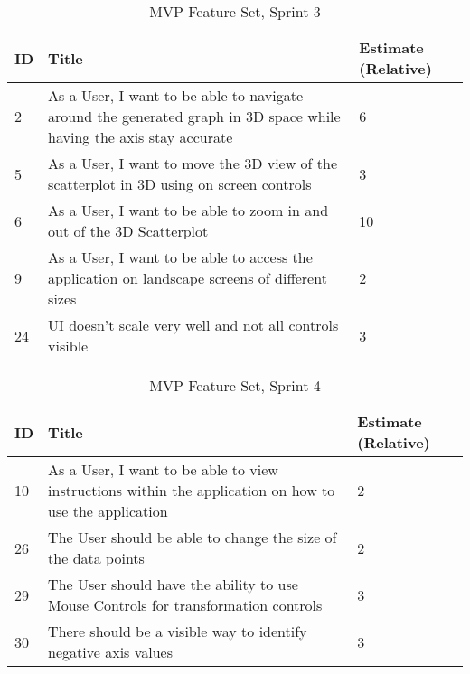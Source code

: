 \begin{table*}[h]
    \begin{tabular}{ | l | l | l | }
        \hline
        ID & Title                                                                                                               & Estimate (Relative) \\
        \hline
        2  & As a User, I want to be able to navigate around the generated graph in 3D space while having the axis stay accurate & 6                   \\
        \hline
        5  & As a User, I want to move the 3D view of the scatterplot in 3D using on screen controls                             & 3                   \\
        \hline
        6  & As a User, I want to be able to zoom in and out of the 3D Scatterplot                                               & 10                  \\
        \hline
        9  & As a User, I want to be able to access the application on landscape screens of different sizes                      & 2                   \\
        \hline
        24 & UI doesn't scale very well and not all controls visible                                                             & 3                   \\
        \hline
    \end{tabular}
    \caption{MVP Feature Set, Sprint 3}
    \label{sprint3}
\end{table*}

\begin{table*}[h]
    \begin{tabular}{ | l | l | l | }
        \hline
        ID & Title                                                                                                  & Estimate (Relative) \\
        \hline
        10 & As a User, I want to be able to view instructions within the application on how to use the application & 2                   \\
        \hline
        26 & The User should be able to change the size of the data points                                          & 2                   \\
        \hline
        29 & The User should have the ability to use Mouse Controls for transformation controls                     & 3                   \\
        \hline
        30 & There should be a visible way to identify negative axis values                                         & 3                   \\
        \hline
    \end{tabular}
    \caption{MVP Feature Set, Sprint 4}
    \label{sprint4}
\end{table*}

